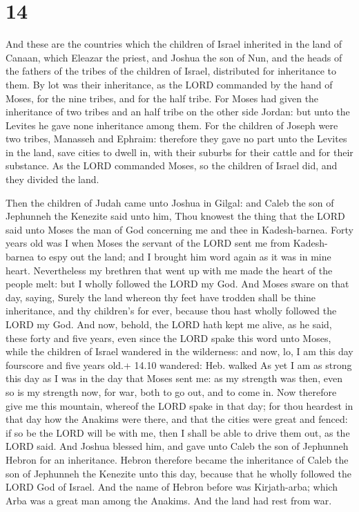 \hypertarget{section-13}{%
\section{14}\label{section-13}}

 And these are the countries which the children of Israel
inherited in the land of Canaan, which Eleazar the priest, and Joshua
the son of Nun, and the heads of the fathers of the tribes of the
children of Israel, distributed for inheritance to them.  By
lot was their inheritance, as the LORD commanded by the hand of Moses,
for the nine tribes, and for the half tribe.  For Moses had
given the inheritance of two tribes and an half tribe on the other side
Jordan: but unto the Levites he gave none inheritance among them.
 For the children of Joseph were two tribes, Manasseh and
Ephraim: therefore they gave no part unto the Levites in the land, save
cities to dwell in, with their suburbs for their cattle and for their
substance.  As the LORD commanded Moses, so the children of
Israel did, and they divided the land.

 Then the children of Judah came unto Joshua in Gilgal:
and Caleb the son of Jephunneh the Kenezite said unto him, Thou knowest
the thing that the LORD said unto Moses the man of God concerning me and
thee in Kadesh-barnea.  Forty years old was I when Moses the
servant of the LORD sent me from Kadesh-barnea to espy out the land; and
I brought him word again as it was in mine heart. 
Nevertheless my brethren that went up with me made the heart of the
people melt: but I wholly followed the LORD my God.  And
Moses sware on that day, saying, Surely the land whereon thy feet have
trodden shall be thine inheritance, and thy children's for ever, because
thou hast wholly followed the LORD my God.  And now,
behold, the LORD hath kept me alive, as he said, these forty and five
years, even since the LORD spake this word unto Moses, while the
children of Israel wandered in the wilderness: and now, lo, I am this
day fourscore and five years old.+ 14.10 wandered: Heb. walked
 As yet I am as strong this day as I was in the day that
Moses sent me: as my strength was then, even so is my strength now, for
war, both to go out, and to come in.  Now therefore give me
this mountain, whereof the LORD spake in that day; for thou heardest in
that day how the Anakims were there, and that the cities were great and
fenced: if so be the LORD will be with me, then I shall be able to drive
them out, as the LORD said.  And Joshua blessed him, and
gave unto Caleb the son of Jephunneh Hebron for an inheritance.
 Hebron therefore became the inheritance of Caleb the son
of Jephunneh the Kenezite unto this day, because that he wholly followed
the LORD God of Israel.  And the name of Hebron before was
Kirjath-arba; which Arba was a great man among the Anakims. And the land
had rest from war.

